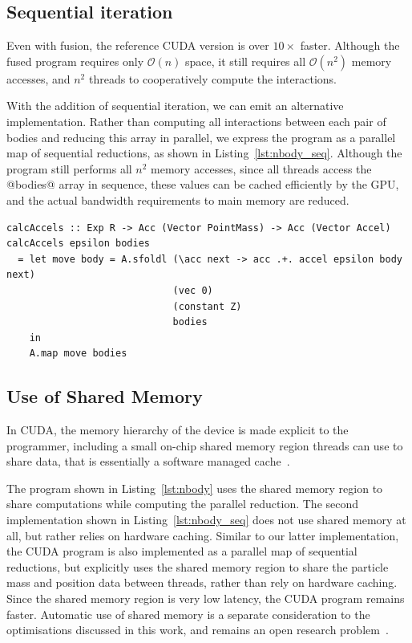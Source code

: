 \subsection{Sequential iteration}

Even with fusion, the reference CUDA version is over $10\times$ faster. Although
the fused program requires only $\mathcal{O}\left( n \right)$ space, it still
requires all $\mathcal{O}\left( n^2 \right)$ memory accesses, and $n^{2}$
threads to cooperatively compute the interactions.

With the addition of sequential iteration, we can emit an alternative
implementation. Rather than computing all interactions between each pair of
bodies and reducing this array in parallel, we express the program as a parallel
map of sequential reductions, as shown in Listing~\ref{lst:nbody_seq}. Although
the program still performs all $n^{2}$ memory accesses, since all threads access
the @bodies@ array in sequence, these values can be cached efficiently by the
GPU, and the actual bandwidth requirements to main memory are reduced.

\begin{lstlisting}[style=haskell_float
    ,label=lst:nbody_seq
    ,caption={$N$-body gravitational simulation, using sequential reduction}]
calcAccels :: Exp R -> Acc (Vector PointMass) -> Acc (Vector Accel)
calcAccels epsilon bodies
  = let move body = A.sfoldl (\acc next -> acc .+. accel epsilon body next)
                             (vec 0)
                             (constant Z)
                             bodies
    in
    A.map move bodies
\end{lstlisting}


\subsection{Use of Shared Memory}

In CUDA, the memory hierarchy of the device is made explicit to the programmer,
including a small on-chip shared memory region threads can use to share data,
that is essentially a software managed cache~\cite{NVIDIA:2012wf}.

The program shown in Listing~\ref{lst:nbody} uses the shared memory region to
share computations while computing the parallel reduction. The second
implementation shown in Listing~\ref{lst:nbody_seq} does not use shared memory
at all, but rather relies on hardware caching. Similar to our latter
implementation, the CUDA program is also implemented as a parallel map of
sequential reductions, but explicitly uses the shared memory region to share the
particle mass and position data between threads, rather than rely on hardware
caching. Since the shared memory region is very low latency, the CUDA program
remains faster. Automatic use of shared memory is a separate consideration to
the optimisations discussed in this work, and remains an open research
problem~\cite{Ma:2010ft}.

